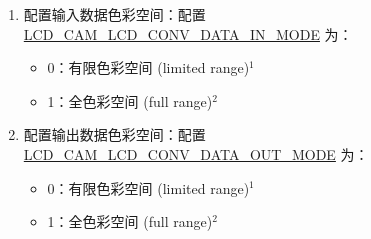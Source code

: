 \documentclass[main\_\_CN.tex]{subfiles}
\begin{document}
\begin{enumerate}
\begin{itemize}
\begin{table}[H]
\begin{threeparttable}
            \end{threeparttable}
            \end{table}
    \end{itemize}

    \item 配置输入数据色彩空间：配置 \hyperref[fielddesc:LCDCAMLCDCONVDATAINMODE]{LCD\_CAM\_LCD\_CONV\_DATA\_IN\_MODE} 为：
    \begin{itemize}
        \item 0：有限色彩空间 (limited range)\hyperref[limited-color-range-note]{$^1$}
        \item 1：全色彩空间 (full range)\hyperref[full-color-range-note]{$^2$}
    \end{itemize}

    \item 配置输出数据色彩空间：配置 \hyperref[fielddesc:LCDCAMLCDCONVDATAOUTMODE]{LCD\_CAM\_LCD\_CONV\_DATA\_OUT\_MODE} 为：
    \begin{itemize}
        \item 0：有限色彩空间 (limited range)\hyperref[limited-color-range-note]{$^1$}
        \item 1：全色彩空间 (full range)\hyperref[full-color-range-note]{$^2$}
    \end{itemize}
\end{enumerate}
\end{document}
